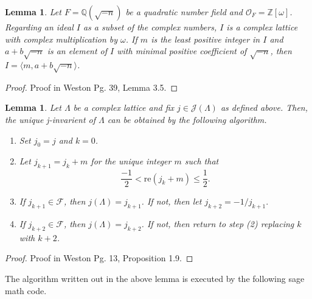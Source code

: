 \documentclass[12pt]{amsart}
\newtheorem{lemma}[theorem]{Lemma}
\theoremstyle{definition}
\theoremstyle{remark}
\begin{document}
\newpage

\begin{lemma}
    Let $F = \mathbb{Q}(\sqrt{-n})$ be a quadratic number field and $\mathcal{O}_F = \mathbb{Z}[\omega]$. Regarding an ideal $I$ as a subset of the complex numbers, $I$ is a complex lattice with complex multiplication by $\omega$. If $m$ is the least positive integer in $I$ and $a+b\sqrt{-n}$ is an element of $I$ with minimal positive coefficient of $\sqrt{-n}$, then $I = \langle m,a+b\sqrt{-n}\rangle$.
\end{lemma}
\begin{proof}
    Proof in Weston Pg. 39, Lemma 3.5.
\end{proof}
\begin{lemma}
    Let $\Lambda$ be a complex lattice and fix $j \in \mathcal{J}(\Lambda)$ as defined above. Then, the unique j-invarient of $\Lambda$ can be obtained by the following algorithm.
    \begin{enumerate}
        \item Set $j_0 = j$ and $k = 0$.
        \item Let $j_{k+1} = j_k + m$ for the unique integer $m$ such that $$\frac{-1}{2} < \text{re}(j_k + m) \leq \frac{1}{2}.$$
        \item If $j_{k+1}\in\mathcal{F}$, then $j(\Lambda) = j_{k+1}$. If not, then let $j_{k+2} = -1/j_{k+1}.$
        \item If $j_{k+2}\in\mathcal{F}$, then $j(\Lambda) = j_{k+2}$. If not, then return to step (2) replacing $k$ with $k+2$.
    \end{enumerate}
\end{lemma}
\begin{proof}
    Proof in Weston Pg. 13, Proposition 1.9.
\end{proof}
The algorithm written out in the above lemma is executed by the following sage math code.
\end{document}
